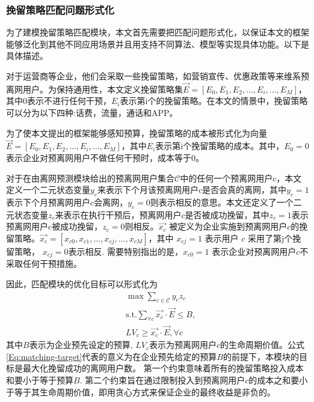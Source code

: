 \subsubsection{挽留策略匹配问题形式化}\par
为了建模挽留策略匹配模块，本文首先需要把匹配问题形式化，以保证本文的框架能够泛化到其他不同应用场景并且用支持不同算法、模型等实现具体功能。以下是具体描述。\par
对于运营商等企业，他们会采取一些挽留策略，如营销宣传、优惠政策等来维系预离网用户。为保持通用性，本文定义挽留策略集$\vec{E} = [E_{0}, E_{1}, E_{2}, ..., E_{i},..., E_{M}]$，其中$0$表示不进行任何干预，$E_{i}$表示第i个的挽留策略。在本文的情景中，挽留策略可以分为以下四种:话费，流量，通话和APP。\par
为了使本文提出的框架能够感知预算，挽留策略的成本被形式化为向量$\vec{E} = [E_{0}, E_{1}, E_{2}, ..., E_{i},..., E_{M}]$，其中$E_{i}$表示第i个挽留策略的成本。其中，$E_{0} = 0$表示企业对预离网用户不做任何干预时，成本等于0。\par
对于在由离网预测模块给出的预离网用户集合$\mathcal{C}$中的任何一个预离网用户c，本文定义一个二元状态变量$y_{c}$来表示下个月该预离网用户c是否会真的离网，其中$y_{c}=1$表示下个月预离网用户c会离网，$y_{c}=0$则表示相反的意思。本文还定义了一个二元状态变量$z_{c}$来表示在执行干预后，预离网用户$c$是否被成功挽留，其中$z_{c} = 1$表示预离网用户c被成功挽留，$z_{c} = 0$则相反。$\vec{x_{c}}$ 被定义为企业实施到预离网用户$c$的挽留策略。$\vec{x_{c}} = [x_{c0}, x_{c1}, ..., x_{cj}, ..., x_{cM}]$，其中 $x_{cj}=1$ 表示用户 $c$ 采用了第j个挽留策略， $x_{cj}=0$表示相反. 需要特别指出的是，$x_{c0}=1$ 表示企业对预离网用户$c$不采取任何干预措施。\par
因此，匹配模块的优化目标可以形式化为
\begin{equation}
	\begin{aligned}
		& \max \sum_{c \in \mathcal{C}} y_{c}z_{c} \\
		& \mathrm{s.t.} \sum_{\forall c} \vec{x_{c}} \cdot \vec{E} \leq B , \\
		& LV_{c} \geq \vec{x_{c}} \cdot \vec{E}, \forall c			
	\end{aligned}
	\label{Eq:matching-target}
\end{equation}	
其中$B$表示为企业预先设定的预算,  $LV_{c}$表示为预离网用户$c$的生命周期价值。公式\eqref{Eq:matching-target}代表的意义为在企业预先给定的预算$B$的前提下，本模块的目标是最大化挽留成功的离网用户数。 第一个约束意味着所有的挽留策略投入成本和要小于等于预算$B$. 第二个约束旨在通过限制投入到预离网用户$c$的成本之和要小于等于其生命周期价值，即用贪心方式来保证企业的最终收益是非负的。\par
